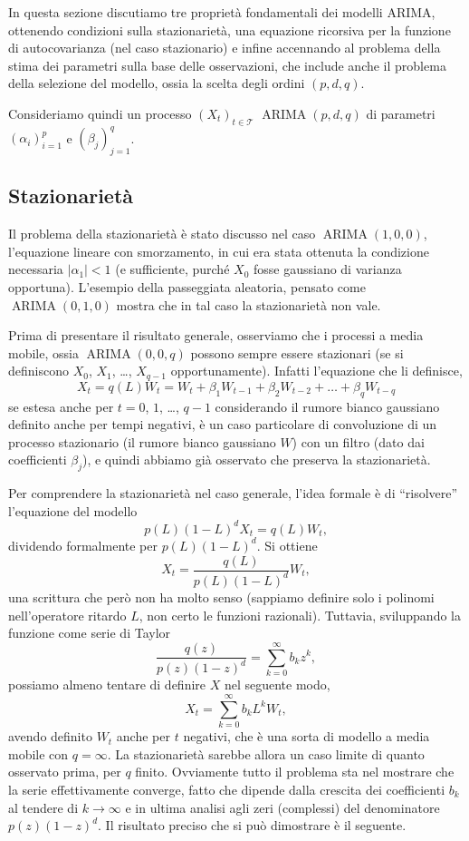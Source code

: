 \documentclass[
  italian,
  letterpaper,
]{book}
\theoremstyle{definition}
\theoremstyle{remark}
\begin{document}
In questa sezione discutiamo tre proprietà fondamentali dei modelli
ARIMA, ottenendo condizioni sulla stazionarietà, una equazione ricorsiva
per la funzione di autocovarianza (nel caso stazionario) e infine
accennando al problema della stima dei parametri sulla base delle
osservazioni, che include anche il problema della selezione del modello,
ossia la scelta degli ordini \((p,d,q)\).

Consideriamo quindi un processo \((X_t)_{t \in \mathcal{T}}\)
\(\operatorname{ARIMA}(p,d,q)\) di parametri \((\alpha_i)_{i=1}^p\) e
\((\beta_j)_{j=1}^q\).

\subsection{Stazionarietà}\label{stazionarietuxe0}

Il problema della stazionarietà è stato discusso nel caso
\(\operatorname{ARIMA}(1,0,0)\), l'equazione lineare con smorzamento, in
cui era stata ottenuta la condizione necessaria \(|\alpha_1| <1\) (e
sufficiente, purché \(X_0\) fosse gaussiano di varianza opportuna).
L'esempio della passeggiata aleatoria, pensato come
\(\operatorname{ARIMA}(0,1,0)\) mostra che in tal caso la stazionarietà
non vale.

Prima di presentare il risultato generale, osserviamo che i processi a
media mobile, ossia \(\operatorname{ARIMA}(0,0,q)\) possono sempre
essere stazionari (se si definiscono \(X_0\), \(X_1\), \ldots,
\(X_{q-1}\) opportunamente). Infatti l'equazione che li definisce,
\[ X_t = q(L) W_t = W_t + \beta_1 W_{t-1} + \beta_2 W_{t-2} + \ldots + \beta_q W_{t-q}\]
se estesa anche per \(t = 0\), \(1\), \ldots, \(q-1\) considerando il
rumore bianco gaussiano definito anche per tempi negativi, è un caso
particolare di convoluzione di un processo stazionario (il rumore bianco
gaussiano \(W\)) con un filtro (dato dai coefficienti \(\beta_j\)), e
quindi abbiamo già osservato che preserva la stazionarietà.

Per comprendere la stazionarietà nel caso generale, l'idea formale è di
``risolvere'' l'equazione del modello \[ p(L)(1-L)^d X_t = q(L) W_t,\]
dividendo formalmente per \(p(L)(1-L)^d\). Si ottiene
\[ X_ t =\frac{ q(L)}{ p(L)(1-L)^d} W_t,\] una scrittura che però non ha
molto senso (sappiamo definire solo i polinomi nell'operatore ritardo
\(L\), non certo le funzioni razionali). Tuttavia, sviluppando la
funzione come serie di Taylor
\[ \frac{ q(z)}{p(z)(1-z)^d}  = \sum_{k=0}^\infty b_k z^k,\] possiamo
almeno tentare di definire \(X\) nel seguente modo,
\[ X_t = \sum_{k=0}^\infty b_k L^k W_t,\] avendo definito \(W_t\) anche
per \(t\) negativi, che è una sorta di modello a media mobile con
\(q=\infty\). La stazionarietà sarebbe allora un caso limite di quanto
osservato prima, per \(q\) finito. Ovviamente tutto il problema sta nel
mostrare che la serie effettivamente converge, fatto che dipende dalla
crescita dei coefficienti \(b_k\) al tendere di \(k \to \infty\) e in
ultima analisi agli zeri (complessi) del denominatore \(p(z)(1-z)^d\).
Il risultato preciso che si può dimostrare è il seguente.
\end{document}

